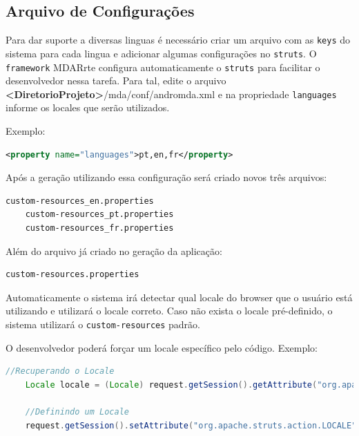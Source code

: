 \subsection{Arquivo de Configurações}

Para dar suporte a diversas linguas é necessário criar um arquivo com as \texttt{keys} do sistema para cada lingua e adicionar algumas configurações no \texttt{struts}. O \texttt{framework} MDARrte configura automaticamente o \texttt{struts} para facilitar o desenvolvedor nessa tarefa. Para tal, edite o arquivo \textbf{<DiretorioProjeto>}/mda/conf/andromda.xml e na propriedade \texttt{languages} informe os locales que serão utilizados.

Exemplo:

\begin{lstlisting}[language=xml, frame=single, breaklines=true]
	<property name="languages">pt,en,fr</property>
\end{lstlisting}

Após a geração utilizando essa configuração será criado novos três arquivos: 

\begin{lstlisting}[language=xml, frame=single, breaklines=true]
	custom-resources_en.properties
	custom-resources_pt.properties
	custom-resources_fr.properties
\end{lstlisting}

Além do arquivo já criado no geração da aplicação:

\begin{lstlisting}[language=xml, frame=single, breaklines=true]
	custom-resources.properties
\end{lstlisting}

Automaticamente o sistema irá detectar qual locale do browser que o usuário está
utilizando e utilizará o locale correto. Caso não exista o locale pré-definido,
o sistema utilizará o \texttt{custom-resources} padrão.

O desenvolvedor poderá forçar um locale específico pelo código. Exemplo: 

\begin{lstlisting}[language=java, frame=single, breaklines=true]
	//Recuperando o Locale
	Locale locale = (Locale) request.getSession().getAttribute("org.apache.struts.action.LOCALE");

	//Definindo um Locale
	request.getSession().setAttribute("org.apache.struts.action.LOCALE", new Locale("pt", "BR"));
\end{lstlisting}
